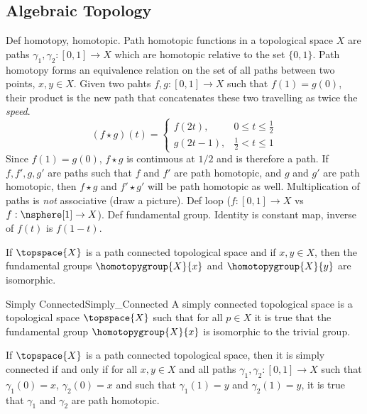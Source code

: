     \subsection{Algebraic Topology}
        Def homotopy, homotopic. Path homotopic functions in a topological
        space $X$ are paths $\gamma_{1},\gamma_{2}:[0,1]\rightarrow{X}$
        which are homotopic relative to the set $\{0,1\}$. Path homotopy
        forms an equivalence relation on the set of all paths between two
        points, $x,y\in{X}$. Given two pahts $f,g:[0,1]\rightarrow{X}$
        such that $f(1)=g(0)$, their product is the new path that
        concatenates these two travelling as twice the \textit{speed}.
        \begin{equation}
            (f\star{g})(t)=
            \begin{cases}
                f(2t),&0\leq{t}\leq\frac{1}{2}\\
                g(2t-1),&\frac{1}{2}<t\leq{1}
            \end{cases}
        \end{equation}
        Since $f(1)=g(0)$, $f\star{g}$ is continuous at $1/2$ and is
        therefore a path. If $f,f',g,g'$ are paths such that $f$ and $f'$
        are path homotopic, and $g$ and $g'$ are path homotopic, then
        $f\star{g}$ and $f'\star{g}'$ will be path homotopic as well.
        Multiplication of paths is \textit{not} associative
        (draw a picture). Def loop ($f:[0,1]\rightarrow{X}$ vs
        $f:\nsphere[1]\rightarrow{X}$). Def fundamental group. Identity is
        constant map, inverse of $f(t)$ is $f(1-t)$.
        \begin{theorem}
            If $\topspace{X}$ is a path connected topological space and if
            $x,y\in{X}$, then the fundamental groups $\homotopygroup{X}{x}$
            and $\homotopygroup{X}{y}$ are isomorphic.
        \end{theorem}
        \begin{fdefinition}{Simply Connected}{Simply_Connected}
            A simply connected topological space is a topological space
            $\topspace{X}$ such that for all $p\in{X}$ it is true that the
            fundamental group $\homotopygroup{X}{x}$ is isomorphic to the
            trivial group.
        \end{fdefinition}
        \begin{theorem}
            If $\topspace{X}$ is a path connected topological space, then
            it is simply connected if and only if for all $x,y\in{X}$ and
            all paths $\gamma_{1},\gamma_{2}:[0,1]\rightarrow{X}$ such that
            $\gamma_{1}(0)=x$, $\gamma_{2}(0)=x$ and such that
            $\gamma_{1}(1)=y$ and $\gamma_{2}(1)=y$, it is true that
            $\gamma_{1}$ and $\gamma_{2}$ are path homotopic.
        \end{theorem}
